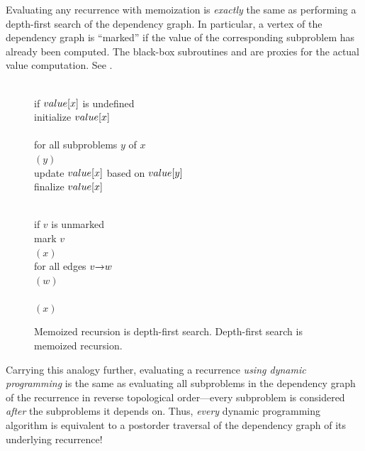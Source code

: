 Evaluating any recurrence with memoization is \textit{exactly} the same as performing a depth-first search of the dependency graph.
In particular, a vertex of the dependency graph is “marked” if the value of the corresponding subproblem has already been computed.
The black-box subroutines  and  are proxies for the actual value computation.
See .

\begin{figure}[ht]
\centering
\begin{minipage}[c]{0.55\linewidth}
\begin{pseudocode}
\\
if $value[x]$ is undefined\\
\Indent initialize $value[x]$\\
\mbox{}\\
\Indent for all subproblems $y$ of $x$\\
\Indent\Indent {}$(y)$\\
\Indent\Indent update $value[x]$ based on $value[y]$\\
\Indent finalize $value[x]$
\end{pseudocode}
\end{minipage}\hfill
\begin{minipage}[c]{0.4\linewidth}
\begin{pseudocode}
\\
if $v$ is unmarked\\
\Indent mark $v$\\
\Indent {}$(x)$\\
\Indent for all edges $v\mathord{\rightarrow}w$\\
\Indent\Indent {}$(w)$\\
\mbox{}\\
\Indent {}$(x)$
\end{pseudocode}
\end{minipage}
\caption{Memoized recursion is depth-first search. Depth-first search is memoized recursion.}
\label{fig:6.10}
\end{figure}

Carrying this analogy further, evaluating a recurrence \textit{using dynamic programming} is the same as evaluating all subproblems in the dependency graph of the recurrence in reverse topological order---every subproblem is considered \textit{after} the subproblems it depends on.
Thus, \textit{every} dynamic programming algorithm is equivalent to a postorder traversal of the dependency graph of its underlying recurrence!

